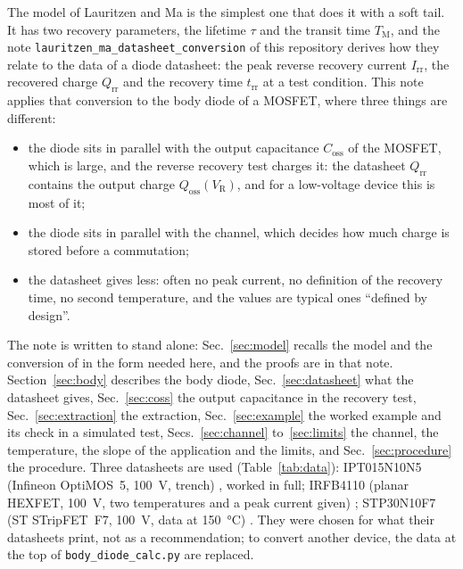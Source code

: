 \documentclass[10pt,a4paper]{scrartcl}
\newcommand{\VR}{V_\mathrm{R}}
\newcommand{\Irr}{I_\mathrm{rr}}
\newcommand{\Qrr}{Q_\mathrm{rr}}
\newcommand{\Qoss}{Q_\mathrm{oss}}
\newcommand{\Coss}{C_\mathrm{oss}}
\newcommand{\trr}{t_\mathrm{rr}}
\newcommand{\TM}{T_\mathrm{M}}
\newcommand{\IPT}{IPT015N10N5}
\newcommand{\IRF}{IRFB4110}
\newcommand{\STP}{STP30N10F7}
\newcommand{\lmnote}{\texttt{lauritzen\_ma\_datasheet\_conversion}}
\begin{document}
The model of Lauritzen and Ma \cite{lauritzen1991} is the simplest one that does it with a soft tail. It has two recovery parameters, the lifetime $\tau$ and the transit time $\TM$, and the note \lmnote{} of this repository \cite{lmnote} derives how they relate to the data of a diode datasheet: the peak reverse recovery current $\Irr$, the recovered charge $\Qrr$ and the recovery time $\trr$ at a test condition. This note applies that conversion to the body diode of a MOSFET, where three things are different:
\begin{itemize}
\item the diode sits in parallel with the output capacitance $\Coss$ of the MOSFET, which is large, and the reverse recovery test charges it: the datasheet $\Qrr$ contains the output charge $\Qoss(\VR)$, and for a low-voltage device this is most of it;
\item the diode sits in parallel with the channel, which decides how much charge is stored before a commutation;
\item the datasheet gives less: often no peak current, no definition of the recovery time, no second temperature, and the values are typical ones ``defined by design''.
\end{itemize}
The note is written to stand alone: Sec.~\ref{sec:model} recalls the model and the conversion of \cite{lmnote} in the form needed here, and the proofs are in that note. Section~\ref{sec:body} describes the body diode, Sec.~\ref{sec:datasheet} what the datasheet gives, Sec.~\ref{sec:coss} the output capacitance in the recovery test, Sec.~\ref{sec:extraction} the extraction, Sec.~\ref{sec:example} the worked example and its check in a simulated test, Secs.~\ref{sec:channel} to~\ref{sec:limits} the channel, the temperature, the slope of the application and the limits, and Sec.~\ref{sec:procedure} the procedure. Three datasheets are used (Table~\ref{tab:data}): \IPT{} (Infineon OptiMOS~5, \SI{100}{\volt}, trench) \cite{ipt}, worked in full; \IRF{} (planar HEXFET, \SI{100}{\volt}, two temperatures and a peak current given) \cite{irf}; \STP{} (ST STripFET~F7, \SI{100}{\volt}, data at \SI{150}{\celsius}) \cite{stp}. They were chosen for what their datasheets print, not as a recommendation; to convert another device, the data at the top of \texttt{body\_diode\_calc.py} are replaced.
\end{document}

